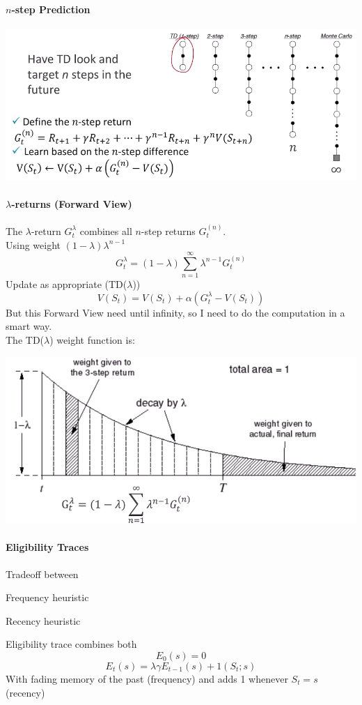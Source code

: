 \documentclass[10pt]{report}
\begin{document}
\paragraph{$n$-step Prediction}
\begin{center}
	\includegraphics[scale=0.5]{169.png} %
\end{center}
\paragraph{$\lambda$-returns (Forward View)} The $\lambda$-return $G_t^\lambda$ combines all $n$-step returns $G_t^{(n)}$.\\
Using weight $(1-\lambda)\lambda^{n-1}$
$$G_t^\lambda = (1-\lambda)\sum_{n=1}^\infty \lambda^{n-1}G_t^{(n)}$$ %
Update as appropriate (TD($\lambda$))
$$V(S_t) = V(S_t) + \alpha(G_t^\lambda - V(S_t))$$
But this Forward View need until infinity, so I need to do the computation in a smart way.\\
The TD($\lambda$) weight function is:
\begin{center}
	\includegraphics[scale=0.5]{170.png}
\end{center}
\paragraph{Eligibility Traces} Tradeoff between
\begin{list}{}{}
	\item Frequency heuristic
	\item Recency heuristic
\end{list}
Eligibility trace combines both
$$E_0(s) = 0$$
$$E_t(s) = \lambda\gamma E_{t-1}(s) + 1(S_t;s)$$
With fading memory of the past (frequency) and adds 1 whenever $S_t = s$ (recency)
\end{document}
